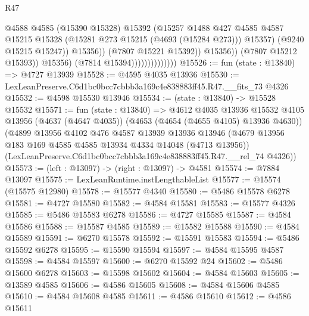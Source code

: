 \begin{lexlean}{R47}
\begin{coremodule}
                                              @4588
                                              @4585
                                              (@15390 @15328)
                                              @15392
                                              (@15257
                                                @1488
                                                @427
                                                @4585
                                                @4587
                                                @15215
                                                @15328
                                                (@15281 @273 @15215 (@4693 (@15284 @273)))
                                                @15357)
                                              (@9240 @15215 @15247))
                                            @15356))
                                        (@7807 @15221 @15392))
                                      @15356))
                                  (@7807 @15212 @15393))
                                @15356)
                              (@7814 @15394))))))))))))))
@15526 := fun (state : @13840) => @4727 @13939
@15528 := @4595 @4035 @13936
@15530 := LexLeanPreserve.C6d1bc0bcc7cbbb3a169c4e838883ff45.R47.__fits_73 @4326
@15532 := @4598 @15530 @13946
@15534 := (state : @13840) -> @15528 @15532
@15571 := fun (state : @13840) =>
  @4612
    @4035
    @13936
    @15532
    @4105
    @13956
    (@4637 (@4647 @4035))
    (@4653 (@4654 (@4655 @4105) @13936 @4630))
    (@4899
      @13956
      @4102
      @476
      @4587
      @13939
      @13936
      @13946
      (@4679 @13956 @183 @169 @4585 @4585 @13934 @4334 @14048 (@4713 @13956))
      (LexLeanPreserve.C6d1bc0bcc7cbbb3a169c4e838883ff45.R47.__rel_74 @4326))
@15573 := (left : @13097) -> (right : @13097) -> @4581
@15574 := @7884 @13097
@15575 := LexLeanRuntime.instLengthableList
@15577 := @15574 (@15575 @12980)
@15578 := @15577 @4340
@15580 := @5486 @15578 @6278
@15581 := @4727 @15580
@15582 := @4584 @15581
@15583 := @15577 @4326
@15585 := @5486 @15583 @6278
@15586 := @4727 @15585
@15587 := @4584 @15586
@15588 := @15587 @4585
@15589 := @15582 @15588
@15590 := @4584 @15589
@15591 := @6270 @15578
@15592 := @15591 @15583
@15594 := @5486 @15592 @6278
@15595 := @15590 @15594
@15597 := @4584 @15595 @4587
@15598 := @4584 @15597
@15600 := @6270 @15592 @24
@15602 := @5486 @15600 @6278
@15603 := @15598 @15602
@15604 := @4584 @15603
@15605 := @13589 @4585
@15606 := @4586 @15605
@15608 := @4584 @15606 @4585
@15610 := @4584 @15608 @4585
@15611 := @4586 @15610
@15612 := @4586 @15611

\end{coremodule}
\end{lexlean}
